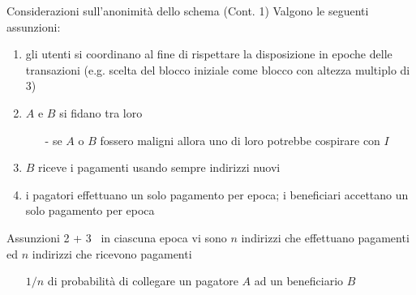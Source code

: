 \documentclass{beamer}
\begin{document}
  
  \begin{frame}{Considerazioni sull'anonimità dello schema (Cont. 1)}
      Valgono le seguenti assunzioni: 
      \begin{enumerate}
          \item gli utenti si coordinano al fine di rispettare la disposizione in epoche delle transazioni (e.g. scelta del blocco iniziale come blocco con altezza multiplo di 3) 
          \item $A$ e $B$ si fidano tra loro 
          \begin{itemize}
              \item[-] se $A$ o $B$ fossero maligni allora uno di loro potrebbe cospirare con $I$
          \end{itemize}
          \item $B$ riceve i pagamenti usando sempre indirizzi nuovi
          \item i pagatori effettuano un solo pagamento per epoca; i beneficiari accettano un solo pagamento per epoca
      \end{enumerate}
      \pause
      \begin{block}{}
      Assunzioni 2 + 3 \MVRightarrow\, in ciascuna epoca vi sono $n$ indirizzi che effettuano pagamenti ed $n$ indirizzi che ricevono pagamenti
      \begin{itemize}
          \item[\MVRightarrow] $1/n$ di probabilità di collegare un pagatore $A$ ad un beneficiario $B$
      \end{itemize}
      \end{block}
  \end{frame}
  
\end{document}
